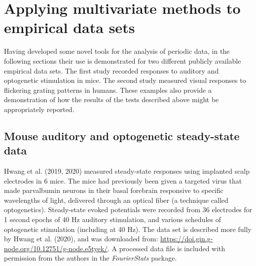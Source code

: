 \documentclass[]{article}
\begin{document}
\hypertarget{applying-multivariate-methods-to-empirical-data-sets}{%
\section{Applying multivariate methods to empirical data sets}\label{applying-multivariate-methods-to-empirical-data-sets}}

Having developed some novel tools for the analysis of periodic data, in the following sections their use is demonstrated for two different publicly available empirical data sets. The first study recorded responses to auditory and optogenetic stimulation in mice. The second study measured visual responses to flickering grating patterns in humans. These examples also provide a demonstration of how the results of the tests described above might be appropriately reported.

\hypertarget{mouse-auditory-and-optogenetic-steady-state-data}{%
\subsection{Mouse auditory and optogenetic steady-state data}\label{mouse-auditory-and-optogenetic-steady-state-data}}

Hwang et al. (2019, 2020) measured steady-state responses using implanted scalp electrodes in 6 mice. The mice had previously been given a targeted virus that made parvalbumin neurons in their basal forebrain responsive to specific wavelengths of light, delivered through an optical fiber (a technique called optogenetics). Steady-state evoked potentials were recorded from 36 electrodes for 1 second epochs of 40 Hz auditory stimulation, and various schedules of optogenetic stimulation (including at 40 Hz). The data set is described more fully by Hwang et al. (2020), and was downloaded from: \url{https://doi.gin.g-node.org/10.12751/g-node.e5tyek/}. A processed data file is included with permission from the authors in the \emph{FourierStats} package.
\end{document}
